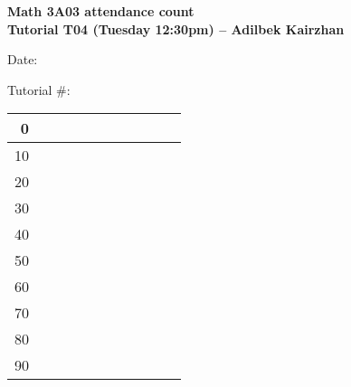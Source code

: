 \documentclass[12pt]{article}
\newcommand{\attendancetableline}[1]{#1 & & & & & & & & & & \\ \hline}
\newcommand{\attendancetable}{%
\begin{tabularx}{0.75\textwidth}{ r | X | X | X | X | X || X | X | X | X | X |}
  \hline
  \attendancetableline{0}
  \attendancetableline{10}
  \attendancetableline{20}
  \attendancetableline{30}
  \attendancetableline{40}
  \attendancetableline{50}
  \attendancetableline{60}
  \attendancetableline{70}
  \attendancetableline{80}
  \attendancetableline{90}
\end{tabularx}
}
\begin{document}
\Huge

\begin{center}
\bfseries 
Math 3A03 attendance count\\
\Large\smallskip
Tutorial T04 (Tuesday 12:30pm) -- Adilbek Kairzhan
\end{center}

\medskip
Date: \underline{\hspace{10cm}}

\medskip

\medskip
Tutorial \#: \underline{\hspace{2.5cm}}

\vspace{1in}
\begin{center}
\attendancetable
\end{center}
\end{document}
